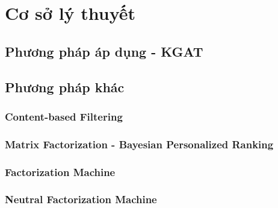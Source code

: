 \section{Cơ sở lý thuyết}
\subsection{Phương pháp áp dụng - KGAT}
\subsection{Phương pháp khác}
\subsubsection{Content-based Filtering}
\subsubsection{Matrix Factorization - Bayesian Personalized Ranking}
\subsubsection{Factorization Machine}
\subsubsection{Neutral Factorization Machine}
